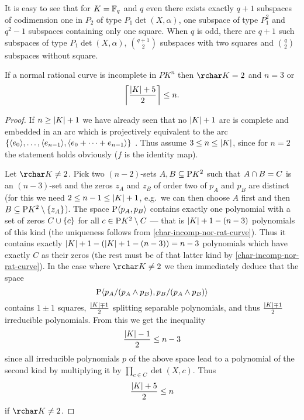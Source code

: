 \begin{remark}
    It is easy to see that for $K=\mathbb{F}_{q}$ and $q$ even there exists exactly $q + 1$ subspaces of codimension one in $P_2$ of type $P_1\det(X,\alpha)$, one subspace of type $P_1^2$ and $q^2-1$ subspaces containing only one square.
    When $q$ is odd, there are $q+1$ such subspaces of type $P_1\det(X,\alpha)$, $\binom {q+1} 2$ subspaces with two squares and $\binom q 2$ subspaces without square.  
\end{remark}

\begin{lemma}
    If a normal rational curve is incomplete in $P K^n$ then $\rchar K =2$ and $n=3$ or
    $$
    \left\lceil\frac{\left\vert{K}\right\vert + 5} 2\right\rceil\leq n.
    $$
\end{lemma}

\begin{proof}
    If $n\geq \left\vert{K}\right\vert + 1$ we have already seen that no $\left\vert{K}\right\vert +1$ arc is complete and embedded in an arc which is projectively equivalent to the arc $\set{\gen{e_0},\ldots,\gen{e_{n-1}},\gen{e_0+\cdots+e_{n-1}}}$ . Thus assume $3\leq n\leq \left\vert{K}\right\vert$, since for $n=2$ the statement holds obviously ($f$ is the identity map).

    Let $\rchar K\neq 2$. Pick two $(n-2)$-sets $A,B\setleq \P K^2$ such that $A\cap B =C$ is an $(n-3)$-set and the zeros $z_A$ and $z_B$ of order two of $p_A$ and $p_B$ are distinct (for this we need $2 \leq n-1\leq \left\vert{K}\right\vert +1$, e.g.~we can then choose $A$ first and then $B\setleq \P K^2\setminus\set{z_A}$).
    The space $\P\gen{p_A,p_B}$ contains exactly one polynomial with a set of zeros $C\setjoin\set c$ for all $c\in\P K^2\setminus C$ --- that is $\left\vert{K}\right\vert + 1 - (n-3)$ polynomials of this kind (the uniqueness follows from \autoref{char-incomp-nor-rat-curve}). Thus it contains exactly $\left\vert{K}\right\vert + 1 - (\left\vert{K}\right\vert + 1 - (n-3))=n-3$ polynomials which have exactly $C$ as their zeros (the rest must be of that latter kind by \autoref{char-incomp-nor-rat-curve}). In the case where $\rchar K\neq 2$ we then immediately deduce that the space
    $$
    \P\gen{p_A/(p_A\meet p_B),p_B/(p_A\meet p_B)}
    $$
    contains $1\pm 1$ squares, $\frac{\left\vert{K}\right\vert \mp 1} 2$ splitting separable polynomials, and thus $\frac{\left\vert{K}\right\vert \mp 1} 2$ irreducible polynomials.
    From this we get the inequality
    $$
    \frac{\left\vert{K}\right\vert - 1} 2\leq n-3
    $$
    since all irreducible polynomials $p$ of the above space lead to a polynomial of the second kind by multiplying it by $\prod_{c\in C}{\det(X,c)}$. Thus
    $$
    \frac{\left\vert{K}\right\vert + 5} 2\leq n
    $$
    if $\rchar K\neq 2$.


\end{proof}
